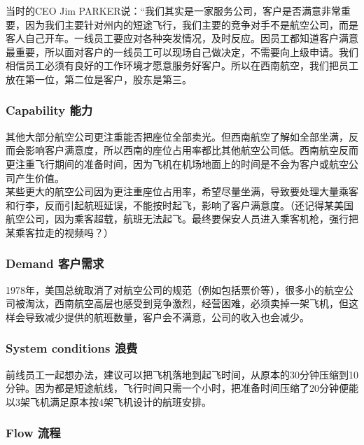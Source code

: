 当时的CEO Jim
PARKER说：``我们其实是一家服务公司，客户是否满意非常重要，因为我们主要针对州内的短途飞行，我们主要的竞争对手不是航空公司，而是客人自己开车。一线员工要应对各种突发情况，及时反应。因员工都知道客户满意最重要，所以面对客户的一线员工可以现场自己做决定，不需要向上级申请。我们相信员工必须有良好的工作环境才愿意服务好客户。所以在西南航空，我们把员工放在第一位，第二位是客户，股东是第三。

\hypertarget{capability-ux80fdux529b}{%
\subsubsection{Capability 能力}\label{capability-ux80fdux529b}}

其他大部分航空公司更注重能否把座位全部卖光。但西南航空了解如全部坐满，反而会影响客户满意度，所以西南的座位占用率都比其他航空公司低。西南航空反而更注重飞行期间的准备时间，因为飞机在机场地面上的时间是不会为客户或航空公司产生价值。\\
某些更大的航空公司因为更注重座位占用率，希望尽量坐满，导致要处理大量乘客和行李，反而引起航班延误，不能按时起飞，影响了客户满意度。（还记得某美国航空公司，因为乘客超载，航班无法起飞。最终要保安人员进入乘客机枪，强行把某乘客拉走的视频吗？）

\hypertarget{demand-ux5ba2ux6237ux9700ux6c42}{%
\subsubsection{Demand 客户需求}\label{demand-ux5ba2ux6237ux9700ux6c42}}

1978年，美国总统取消了对航空公司的规范（例如包括票价等），很多小的航空公司被淘汰，西南航空高层也感受到竞争激烈，经营困难，必须卖掉一架飞机，但这样会导致减少提供的航班数量，客户会不满意，公司的收入也会减少。

\hypertarget{system-conditions-ux6d6aux8d39}{%
\subsubsection{System conditions
浪费}\label{system-conditions-ux6d6aux8d39}}

前线员工一起想办法，建议可以把飞机落地到起飞时间，从原本的30分钟压缩到10分钟。因为都是短途航线，飞行时间只需一个小时，把准备时间压缩了20分钟便能以3架飞机满足原本按4架飞机设计的航班安排。

\hypertarget{flow-ux6d41ux7a0b}{%
\subsubsection{Flow 流程}\label{flow-ux6d41ux7a0b}}

